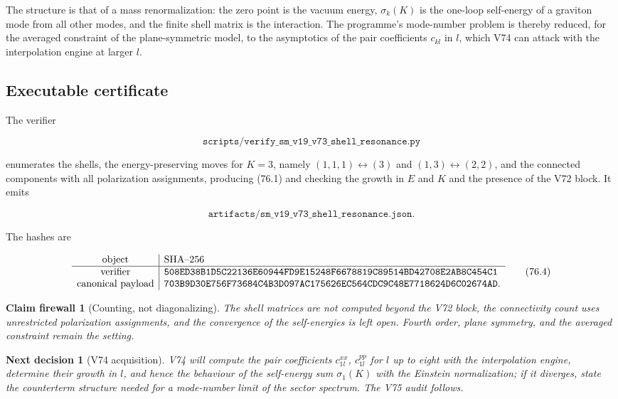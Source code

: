 \documentclass[11pt]{article}
\newtheorem{firewall}[theorem]{Claim firewall}
\newtheorem{decision}[theorem]{Next decision}
\theoremstyle{remark}
\begin{document}
The structure is that of a mass renormalization: the zero point is
the vacuum energy, \(\sigma_k(K)\) is the one-loop self-energy of a
graviton mode from all other modes, and the finite shell matrix is the
interaction.  The programme's mode-number problem is thereby reduced,
for the averaged constraint of the plane-symmetric model, to the
asymptotics of the pair coefficients \(c_{kl}\) in \(l\), which V74 can
attack with the interpolation engine at larger \(l\).

\subsection{Executable certificate}

The verifier

\[
 \texttt{scripts/verify\_sm\_v19\_v73\_shell\_resonance.py}          \tag{76.2}
\]

enumerates the shells, the energy-preserving moves for \(K=3\), namely
\((1,1,1)\leftrightarrow(3)\) and \((1,3)\leftrightarrow(2,2)\), and the
connected components with all polarization assignments, producing
(76.1) and checking the growth in \(E\) and \(K\) and the presence of
the V72 block.  It emits

\[
 \texttt{artifacts/sm\_v19\_v73\_shell\_resonance.json}.             \tag{76.3}
\]

The hashes are

\[
\begin{array}{c|l}
\hbox{object}&\hbox{SHA--256}\\ \hline
\hbox{verifier}&
\texttt{508ED38B1D5C22136E60944FD9E15248F6678819C89514BD42708E2AB8C454C1}\\
\hbox{canonical payload}&
\texttt{703B9D30E756F73684C4B3D097AC175626EC564CDC9C48E7718624D6C02674AD}.
\end{array}                                                     \tag{76.4}
\]

\begin{firewall}[Counting, not diagonalizing]
\label{fire:v19v73}
The shell matrices are not computed beyond the V72 block, the
connectivity count uses unrestricted polarization assignments, and the
convergence of the self-energies is left open.  Fourth order, plane
symmetry, and the averaged constraint remain the setting.
\end{firewall}

\begin{decision}[V74 acquisition]
\label{dec:v19v73-next}
V74 will compute the pair coefficients \(c^{xx}_{1l}\), \(c^{pp}_{1l}\)
for \(l\) up to eight with the interpolation engine, determine their
growth in \(l\), and hence the behaviour of the self-energy sum
\(\sigma_1(K)\) with the Einstein normalization; if it diverges, state
the counterterm structure needed for a mode-number limit of the
sector spectrum.  The V75 audit follows.
\end{decision}
\end{document}
